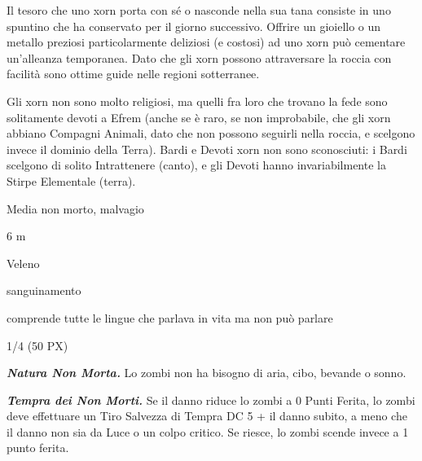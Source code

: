 \begin{multicols}{2}
{Il tesoro che uno xorn porta con sé o nasconde nella sua tana consiste in uno spuntino che ha conservato per il giorno successivo. Offrire un gioiello o un metallo preziosi particolarmente deliziosi (e costosi) ad uno xorn può cementare un'alleanza temporanea. Dato che gli xorn possono attraversare la roccia con facilità sono ottime guide nelle regioni sotterranee.

Gli xorn non sono molto religiosi, ma quelli fra loro che trovano la fede sono solitamente devoti a Efrem (anche se è raro, se non improbabile, che gli xorn abbiano Compagni Animali, dato che non possono seguirli nella roccia, e scelgono invece il dominio della Terra). Bardi e Devoti xorn non sono sconosciuti: i Bardi scelgono di solito Intrattenere (canto), e gli Devoti hanno invariabilmente la Stirpe Elementale (terra).


\begin{description}[noitemsep, topsep=0pt, parsep=0pt, partopsep=0pt, itemsep=1pt, leftmargin=2.35cm,  labelwidth=2.2cm, itemindent=0cm, listparindent=0pt] %
\setlength{\baselineskip}{10pt}
\item[\textbf{Taglia/Tipo}] Media non morto, malvagio
\item[\textbf{Caratt.}] 
\item[\textbf{Punti Ferita}] 
\item[\textbf{Movimento}] 6 m
\item[\textbf{Tiri Salvez.}] 
\item[\textbf{Imm. Danni}] Veleno
\item[\textbf{Immunità}] sanguinamento
\item[\textbf{Sensi}] 
\item[\textbf{Linguaggi}] comprende tutte le lingue che parlava in vita ma non può parlare
\item[\textbf{Sfida}] 1/4 (50 PX)
\end{description}
\smallskip

\emph{\textbf{Natura Non Morta.}} Lo zombi non ha bisogno di aria, cibo, bevande o sonno.

\emph{\textbf{Tempra dei Non Morti.}} Se il danno riduce lo zombi a 0 Punti Ferita, lo zombi deve effettuare un Tiro Salvezza di Tempra DC 5 + il danno subito, a meno che il danno non sia da Luce o un colpo critico. Se riesce, lo zombi scende invece a 1 punto ferita.

}
\end{multicols}
